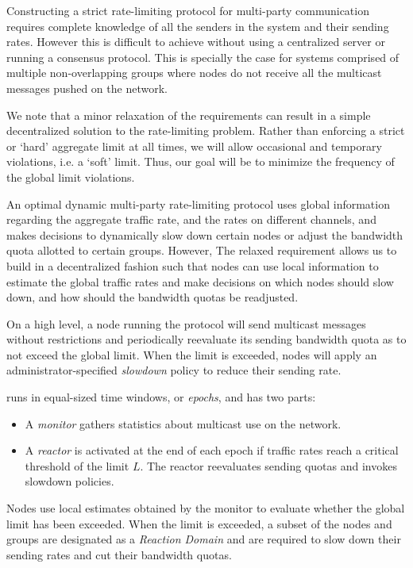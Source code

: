 \newcommand{\E}{\mathbb{E}}

Constructing a strict rate-limiting protocol for multi-party communication requires complete knowledge of all the senders in the system and their sending rates. However this is difficult to achieve without using a centralized server or running a consensus protocol. This is specially the case for systems comprised of multiple non-overlapping groups where nodes do not receive all the multicast messages pushed on the network.

We note that a minor relaxation of the requirements can result in a simple decentralized solution to the rate-limiting problem. Rather than enforcing a strict or `hard' aggregate limit at all times, we will allow occasional and temporary violations, i.e. a `soft' limit. Thus, our goal will be to minimize the frequency of the global limit violations.

An optimal dynamic multi-party rate-limiting protocol uses global information regarding the aggregate traffic rate, and the rates on different channels, and makes decisions to dynamically slow down certain nodes or adjust the bandwidth quota allotted to certain groups. However, The relaxed requirement allows us to build \sysname{} in a decentralized fashion such that nodes can use local information to estimate the global traffic rates and make decisions on which nodes should slow down, and how should the bandwidth quotas be readjusted.

On a high level, a node running the \sysname{} protocol will send multicast messages without restrictions and periodically reevaluate its sending bandwidth quota as to not exceed the global limit. When the limit is exceeded, nodes will apply an administrator-specified \textit{slowdown} policy to reduce their sending rate.

\sysname{} runs in equal-sized time windows, or \textit{epochs}, and has two parts:
\begin{itemize}
\item A \emph{monitor} gathers statistics about multicast use on the network.

\item A \emph{reactor} is activated at the end of each epoch if traffic rates reach a critical threshold of the limit $L$. The reactor reevaluates sending quotas and invokes slowdown policies.
\end{itemize}

Nodes use local estimates obtained by the monitor to evaluate whether the global limit has been exceeded. When the limit is exceeded, a subset of the nodes and groups are designated as a \textit{Reaction Domain} and are required to slow down their sending rates and cut their bandwidth quotas.

